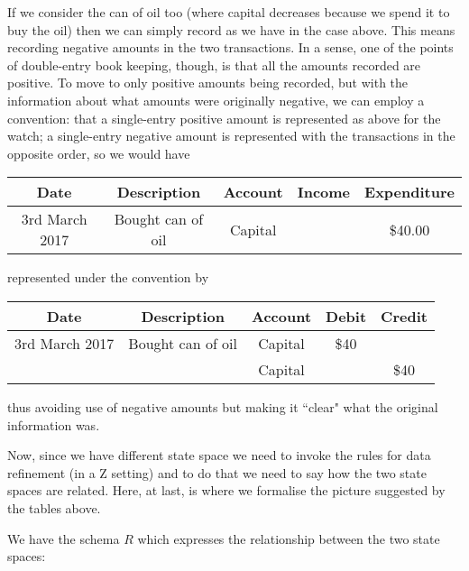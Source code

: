 \documentclass[11pt]{amsart}
\begin{document}
If we consider the can of oil too (where capital decreases because we spend it to buy the oil) then we can simply record as we have in the case above. This means recording negative amounts in the two transactions. In a sense, one of the points of double-entry book keeping, though, is that all the amounts recorded are positive. To move to only positive amounts being recorded, but with the information about what amounts were originally negative, we can employ a convention: that a single-entry positive amount is represented as above for the watch; a single-entry negative amount is represented with the transactions in the opposite order, so we would have

\begin{center}
\begin{tabular}{|c|c|c|c|c|}
Date & Description & Account & Income & Expenditure \\
\hline \hline
3rd March 2017 & Bought can of oil & Capital &  & \$40.00 \\
\end{tabular}
\end{center}
\label{default}

represented under the convention by

\begin{center}
\begin{tabular}{|c|c|c|c|c|}
Date & Description & Account & Debit & Credit\\
\hline \hline
3rd March 2017 & Bought can of oil  & Capital & \$40  &  \\
\hline
& &  Capital &  & \$40 \\
\end{tabular}
\end{center}
\label{default}

thus avoiding use of negative amounts but making it ``clear" what the original information was.

Now, since we have different state space we need to invoke the rules for data refinement (in a Z setting) and to do that we need to say how the two state spaces are related. Here, at last, is where we formalise the picture suggested by the tables above.

We have the schema $R$ which expresses the relationship between the two state spaces:
\end{document}
